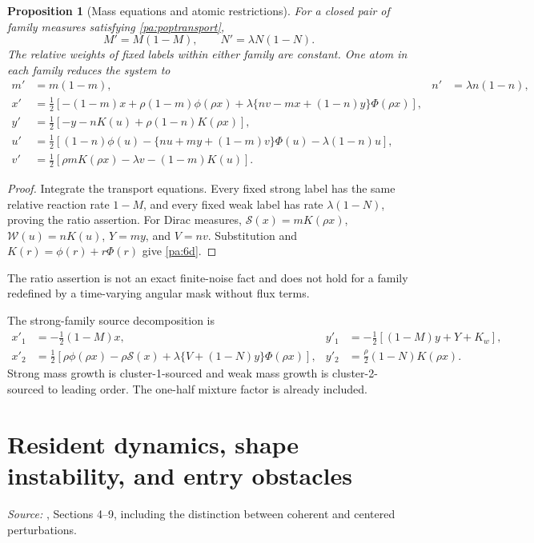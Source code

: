 \documentclass[11pt]{article}
\numberwithin{equation}{section}
\newtheorem{proposition}{Proposition}[section]
\theoremstyle{definition}
\theoremstyle{remark}
\newcommand{\1}{\mathbf 1}
\newcommand{\source}[1]{\par\noindent\textit{Source:} #1\par\smallskip}
\begin{document}
\begin{proposition}[Mass equations and atomic restrictions]\label{pa:masslaws}
For a closed pair of family measures satisfying
\eqref{pa:poptransport},
\begin{equation}\label{pa:logistic}
 M'=M(1-M),\qquad N'=\lambda N(1-N).
\end{equation}
The relative weights of fixed labels within either family are constant.
One atom in each family reduces the system to
\begin{align}
 m'&=m(1-m),&n'&=\lambda n(1-n),\label{pa:6d}\\
 x'&=\tfrac12[-(1-m)x+\rho(1-m)\phi(\rho x)
 +\lambda\{nv-mx+(1-n)y\}\Phi(\rho x)],\nonumber\\
 y'&=\tfrac12[-y-nK(u)+\rho(1-n)K(\rho x)],\nonumber\\
 u'&=\tfrac12[(1-n)\phi(u)-\{nu+my+(1-m)v\}\Phi(u)
 -\lambda(1-n)u],\nonumber\\
 v'&=\tfrac12[\rho mK(\rho x)-\lambda v-(1-m)K(u)].\nonumber
\end{align}
\end{proposition}
\begin{proof}
Integrate the transport equations. Every fixed strong label has the same
relative reaction rate $1-M$, and every fixed weak label has rate
$\lambda(1-N)$, proving the ratio assertion. For Dirac measures,
$\mathcal S(x)=mK(\rho x)$, $\mathcal W(u)=nK(u)$,
$Y=my$, and $V=nv$. Substitution and $K(r)=\phi(r)+r\Phi(r)$ give
\eqref{pa:6d}.
\end{proof}
The ratio assertion is not an exact finite-noise fact and does not hold for
a family redefined by a time-varying angular mask without flux terms.

The strong-family source decomposition is
\begin{align}
 x'_1&=-\tfrac12(1-M)x,&
 y'_1&=-\tfrac12[(1-M)y+Y+K_w],\label{pa:pop-sources}\\
 x'_2&=\tfrac12[\rho\phi(\rho x)-\rho\mathcal S(x)
 +\lambda\{V+(1-N)y\}\Phi(\rho x)],&
 y'_2&=\tfrac\rho2(1-N)K(\rho x).\nonumber
\end{align}
Strong mass growth is cluster-1-sourced and weak mass growth is
cluster-2-sourced to leading order. The one-half mixture factor is already
included.

\section{Resident dynamics, shape instability, and entry obstacles}
\label{pa:shape}
\source{\cite{SP}, Sections 4--9, including the distinction between coherent
and centered perturbations.}
\end{document}
